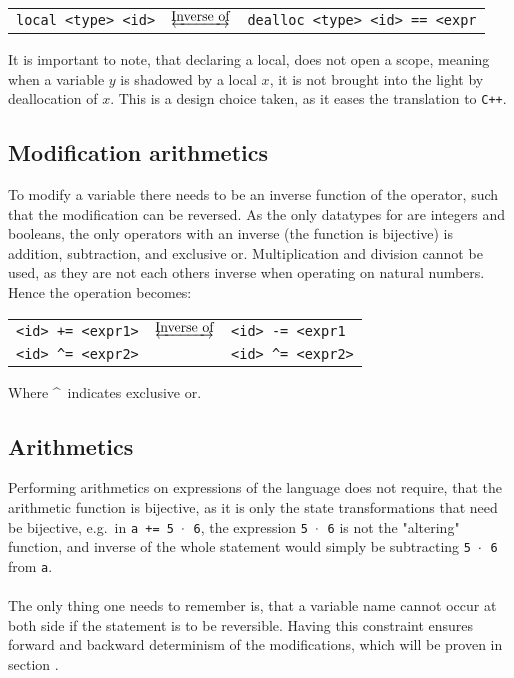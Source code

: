 \begin{table*}[h]
    \centering
    \begin{tabular}{lcl}
        \texttt{local <type> <id>}
        & $\underleftrightarrow{\text{Inverse of}}$ &
        \texttt{dealloc <type> <id> == <expr}
    \end{tabular}
\end{table*}
\noindent
It is important to note, that declaring a local, does not open a scope, meaning when a variable
$y$ is shadowed by a local $x$, it is not brought into the light by deallocation of $x$.
This is a design choice taken, as it eases the translation to \texttt{C++}.

\subsection{Modification arithmetics}
To modify a variable there needs to be an inverse function of the operator, such that the
modification can be reversed. As the only datatypes for \lan are integers and booleans,
the only operators with an inverse (the function is bijective) is addition, subtraction, and
exclusive or. Multiplication and division cannot be used, as they are not each others inverse
when operating on natural numbers. Hence the operation becomes:

\begin{table*}[h]
    \centering
    \begin{tabular}{lcl}
        \texttt{<id> += <expr1>} & $\underleftrightarrow{\text{Inverse of}}$ & \texttt{<id> -= <expr1} \\
        \texttt{<id> \textasciicircum= <expr2>} & & \texttt{<id> \textasciicircum= <expr2>}
    \end{tabular}
\end{table*}
\noindent
Where \textasciicircum ~indicates exclusive or.

\subsection{Arithmetics}
Performing arithmetics on expressions of the language does not require, that the arithmetic function
is bijective, as it is only the state transformations that need be bijective, e.g.\ in
\texttt{a += 5 $\cdot$ 6}, the expression \texttt{5 $\cdot$ 6} is not the "altering" function, and
inverse of the whole statement would simply be subtracting \texttt{5 $\cdot$ 6} from \texttt{a}.
\\
\\
The only thing one needs to remember is, that a variable name cannot occur at both side if the
statement is to be reversible. Having this constraint ensures forward and backward determinism
of the modifications, which will be proven in section .

